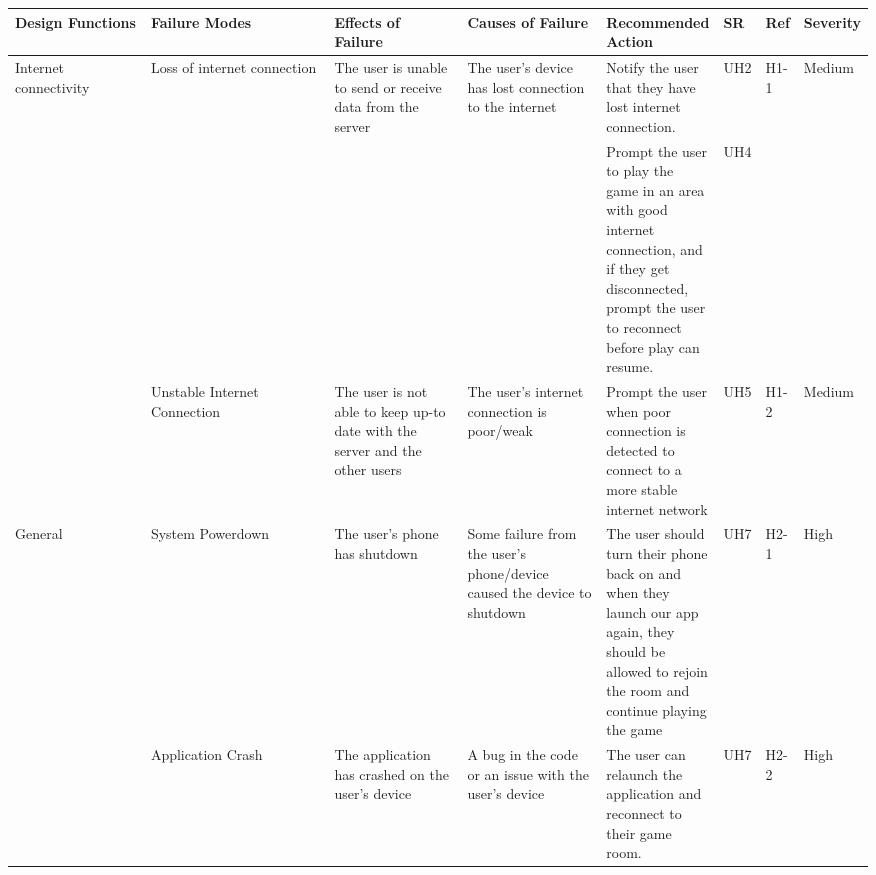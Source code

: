 \documentclass{article}
\begin{document}
\begin{table}[H]
    \begin{adjustbox}{width=(/5)}
    \centering
    

    \begin{tabular}{|p{0.20\linewidth} | p{0.30\linewidth} | p{0.20\linewidth}|  p{0.20\linewidth}|  p{0.30\linewidth}|  p{0.07\linewidth}|  p{0.07\linewidth}|p{0.12\linewidth}| }
    \hline
         \textbf{Design Functions} & \textbf{Failure Modes} & \textbf{Effects of Failure} & \textbf{Causes of Failure} & \textbf{Recommended Action} & \textbf{SR} & \textbf{Ref} & \textbf{Severity}\\
         \hline
        Internet connectivity      &      Loss of internet connection           &       The user is unable to send or receive data from the server                      &                The user's device has lost connection to the internet            &                  Notify the user that they have lost internet connection. &UH2&H1-1&Medium\\&&&& Prompt the user to play the game in an area with good internet connection, and if they get disconnected, prompt the user to reconnect before play can resume.           & UH4            &           &                  \\
                                   &     Unstable Internet Connection     &  The user is not able to keep up-to date with the server and the other users &  The user's internet connection is poor/weak    &        Prompt the user when poor connection is detected to connect to a more stable internet network           &  UH5           &  H1-2           &    Medium              \\
          \hline
        General                    &      System Powerdown     &          The user's phone has shutdown                   &     Some failure from the user's phone/device caused the device to shutdown        &     The user should turn their phone back on and when they launch our app again, they should be allowed to rejoin the room and continue playing the game       & UH7            &   H2-1           &        High          \\
                                   &       Application Crash     &      The application has crashed on the user's device         &     A bug in the code or an issue with the user's device     &     The user can relaunch the application and reconnect to their game room.    &  UH7           &   H2-2          &   High               \\

\end{tabular}
\end{adjustbox}
\end{table}
\end{document}
